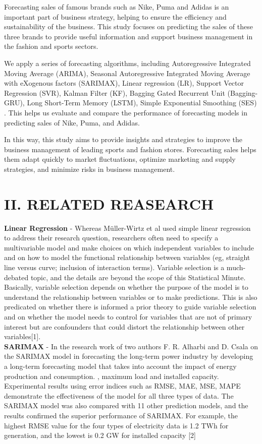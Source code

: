 \documentclass[conference]{IEEEtran}
\begin{document}
Forecasting sales of famous brands such as Nike, Puma and Adidas is an important part of business strategy, helping to ensure the efficiency and sustainability of the business. This study focuses on predicting the sales of these three brands to provide useful information and support business management in the fashion and sports sectors.

We apply a series of forecasting algorithms, including Autoregressive Integrated Moving Average (ARIMA), Seasonal Autoregressive Integrated Moving Average with eXogenous factors (SARIMAX), Linear regression (LR), Support Vector Regression (SVR), Kalman Filter (KF), Bagging Gated Recurrent Unit (Bagging-GRU), Long Short-Term Memory (LSTM), Simple Exponential Smoothing (SES) . This helps us evaluate and compare the performance of forecasting models in predicting sales of Nike, Puma, and Adidas.

In this way, this study aims to provide insights and strategies to improve the business management of leading sports and fashion stores. Forecasting sales helps them adapt quickly to market fluctuations, optimize marketing and supply strategies, and minimize risks in business management.

\section*{II. RELATED REASEARCH}
\textbf{Linear Regression} - Whereas Müller-Wirtz et al used simple linear regression to address their research question, researchers often need to specify a multivariable model and make choices on which independent variables to include and on how to model the functional relationship between variables (eg, straight line versus curve; inclusion of interaction terms).
Variable selection is a much-debated topic, and the details are beyond the scope of this Statistical Minute. Basically, variable selection depends on whether the purpose of the model is to understand the relationship between variables or to make predictions. This is also predicated on whether there is informed a prior theory to guide variable selection and on whether the model needs to control for variables that are not of primary interest but are confounders that could distort the relationship between other variables[1].\\

\textbf{SARIMAX} - In the research work of two authors F. R. Alharbi and D. Csala on the SARIMAX model in forecasting the long-term power industry by developing a long-term forecasting model that takes into account the impact of energy production and consumption. , maximum load and installed capacity. Experimental results using error indices such as RMSE, MAE, MSE, MAPE demonstrate the effectiveness of the model for all three types of data. The SARIMAX model was also compared with 11 other prediction models, and the results confirmed the superior performance of SARIMAX. For example, the highest RMSE value for the four types of electricity data is 1.2 TWh for generation, and the lowest is 0.2 GW for installed capacity [2]
\end{document}
